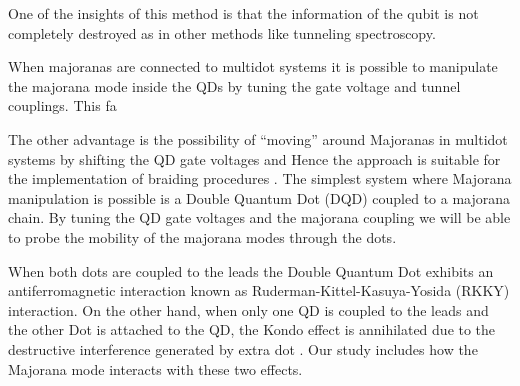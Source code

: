 \documentclass[showpacs,aps,prb,reprint,superscriptaddress]{revtex4-1}
\begin{document}




 One of the insights of this method is that the information of the qubit is not completely destroyed as in other methods like tunneling spectroscopy. 
 
 When majoranas are connected to multidot systems it is possible to manipulate the majorana mode inside the QDs  by tuning the gate voltage and  tunnel couplings. This fa
 
 
 The other advantage  is the possibility of “moving” around Majoranas  in multidot systems by shifting the QD gate voltages and Hence the approach is suitable for the implementation of braiding procedures . The simplest system where Majorana manipulation is possible is  a  Double Quantum Dot (DQD) coupled to a majorana chain. By tuning the QD gate voltages and the majorana coupling we will be able to probe the mobility of the majorana modes through the dots. 
 
 When both dots are coupled to the leads the Double Quantum Dot exhibits an antiferromagnetic interaction known as  Ruderman-Kittel-Kasuya-Yosida (RKKY) interaction\cite{ruderman_indirect_1954,kasuya_theory_1956,yosida_magnetic_1957}. On the other hand, when only one QD is coupled to the leads and the other Dot is attached to the QD,  the Kondo effect is annihilated due to the destructive interference  generated by extra dot \cite{dias_da_silva_transmission_2008}. Our study includes how the Majorana mode interacts with these two effects.  
\end{document}
